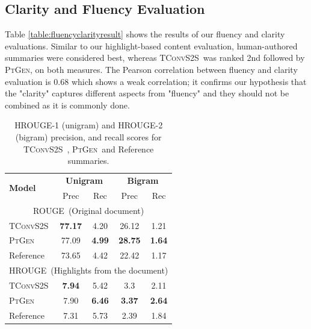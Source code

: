 \documentclass[11pt,a4paper]{article}
\newcommand\todo[1]{{\textcolor{red}{todo: #1}}}
\newcommand\ptgen{\textsc{PtGen}}
\newcommand\tconv{\textsc{TConvS2S}}
\newcommand\xsum{\textsc{XSum}}
\newcommand\hrouge{\textsc{HROUGE}}
\newcommand\rouge{\textsc{ROUGE}}
\begin{document}
\subsection{Clarity and Fluency Evaluation} 


Table \ref{table:fluencyclarityresult} shows the results of our 
fluency and clarity evaluations. Similar to our highlight-based content evaluation, human-authored summaries were considered best, whereas \tconv\  was  ranked  2nd  followed  by  \ptgen, on both measures. 
The Pearson correlation between fluency and clarity evaluation is 0.68 which shows a weak correlation; it confirms our hypothesis that the "clarity" captures different aspects from "fluency" and they should not be combined as it is commonly done. 

\begin{table}[t!]
\centering
\small
\begin{tabular}{l|cc|cc}
\hline
\multirow{2}{*}{\textbf{Model}} & \multicolumn{2}{c|}{\textbf{Unigram}} & \multicolumn{2}{c}{\textbf{Bigram}} \\
& Prec     & Rec  & Prec     & Rec     \\
\hline 
\multicolumn{5}{c}{\rouge\ (Original document)} \\
\hline
\tconv{}              & \textbf{77.17}    & 4.20    & 26.12    & 1.21    \\
\ptgen{}                  & 77.09    & \textbf{4.99}       & \textbf{28.75}    & \textbf{1.64}      \\
Reference              & 73.65    & 4.42    & 22.42    & 1.17      \\
\hline
\multicolumn{5}{c}{\hrouge\ (Highlights from the document)} \\
\hline
\tconv{}               &   \textbf{7.94}  &  5.42  & 3.3 &  2.11   \\
\ptgen{}                 & 7.90    & \textbf{6.46}      & \textbf{3.37}    & \textbf{2.64}     \\
Reference              &  7.31  & 5.73   &  2.39  & 1.84   \\
\hline
\end{tabular}
\caption{\hrouge-1 (unigram) and \hrouge-2 (bigram) precision, and recall scores for \tconv\ , \ptgen\  and Reference summaries.}
\label{table:rougeandhrougeresult}
\end{table}
\end{document}
